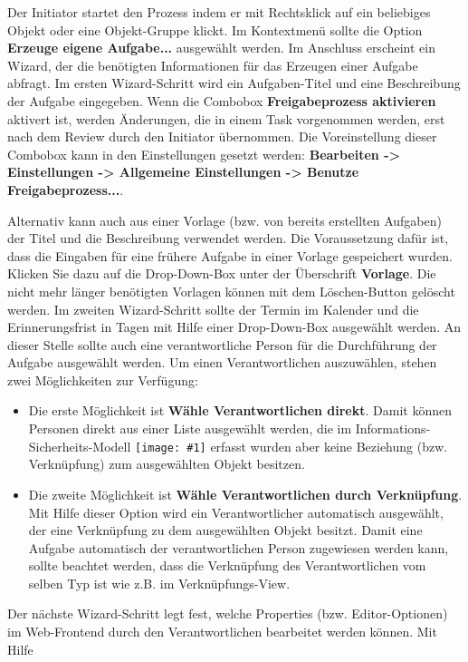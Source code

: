 \documentclass[a4paper,10pt]{book}
\newcommand{\icon}[1]{\texttt{[image: \#1]}}
\begin{document}
Der Initiator startet den Prozess indem er mit Rechtsklick auf ein beliebiges Objekt oder eine Objekt-Gruppe klickt. Im Kontextmenü sollte die Option
\textbf{Erzeuge eigene Aufgabe...} ausgewählt werden. Im Anschluss erscheint ein Wizard, der die benötigten Informationen für das Erzeugen einer Aufgabe
abfragt. Im ersten Wizard-Schritt wird ein Aufgaben-Titel und eine Beschreibung der Aufgabe eingegeben. Wenn die Combobox \textbf{Freigabeprozess aktivieren} aktivert ist, werden Änderungen, die in einem Task vorgenommen werden, erst nach dem Review durch den Initiator übernommen. Die Voreinstellung dieser Combobox kann in den Einstellungen gesetzt werden: \textbf{Bearbeiten -> Einstellungen -> Allgemeine Einstellungen -> Benutze Freigabeprozess...}.

Alternativ kann auch aus einer Vorlage (bzw. von bereits erstellten Aufgaben) der Titel und die
Beschreibung verwendet werden. Die Voraussetzung dafür ist, dass die Eingaben für eine frühere Aufgabe in einer Vorlage gespeichert wurden.
Klicken Sie dazu auf die Drop-Down-Box unter der Überschrift \textbf{Vorlage}.
Die nicht mehr länger benötigten Vorlagen können mit dem Löschen-Button gelöscht werden.
Im zweiten Wizard-Schritt sollte der Termin im Kalender und die Erinnerungsfrist in Tagen mit Hilfe einer Drop-Down-Box ausgewählt werden.
An dieser Stelle sollte auch eine verantwortliche Person
für die Durchführung der Aufgabe ausgewählt werden. Um einen Verantwortlichen auszuwählen, stehen zwei Möglichkeiten zur Verfügung:
\begin{itemize}
 \item Die erste Möglichkeit ist \textbf{Wähle Verantwortlichen direkt}. Damit können Personen direkt aus einer Liste ausgewählt werden,
die im Informations-Sicherheits-Modell \icon{Icon/Informationssicherheitsmodell.png} erfasst wurden aber
keine Beziehung (bzw. Verknüpfung) zum ausgewählten Objekt besitzen.
  \item Die zweite Möglichkeit ist \textbf{Wähle Verantwortlichen durch Verknüpfung}. Mit Hilfe dieser Option wird ein Verantwortlicher automatisch
ausgewählt, der eine Verknüpfung zu dem ausgewählten Objekt besitzt. Damit eine Aufgabe automatisch der verantwortlichen Person zugewiesen werden kann, sollte
beachtet werden, dass die Verknüpfung des Verantwortlichen vom selben Typ ist wie z.B. im Verknüpfungs-View.
\end{itemize}
Der nächste Wizard-Schritt legt fest, welche Properties (bzw. Editor-Optionen) im Web-Frontend durch den Verantwortlichen bearbeitet werden können. Mit Hilfe
\end{document}
